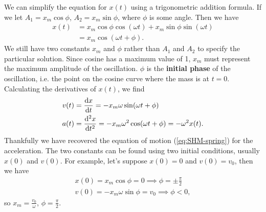 \documentclass[../classical_mechanics.tex]{subfiles}
\begin{document}
        We can simplify the equation for $x(t)$ using a trigonometric addition formula.
        If we let $A_1=x_m\cos\phi$, $A_2=x_m\sin\phi$, where $\phi$ is some angle.
        Then we have
        \begin{align}
            x(t)&=x_m\cos\phi\cos(\omega t)+x_m\sin\phi\sin(\omega t)\\
            &=x_m\cos(\omega t+\phi)\label{eq:SHM-displacement}.
        \end{align}
        We still have two constants $x_m$ and $\phi$ rather than $A_1$ and $A_2$ to specify the particular solution.
        Since cosine has a maximum value of 1, $x_m$ must represent the maximum amplitude of the oscillation.
        $\phi$ is the \textbf{initial phase} of the oscillation, i.e. the point on the cosine curve where the mass is at $t=0$.
        Calculating the derivatives of $x(t)$, we find
        \begin{align}
            v(t)&=\dv{x}{t}=-x_m\omega\sin(\omega t+\phi)\label{eq:SHM-velocity}\\
            a(t)&=\dv[2]{x}{t}=-x_m\omega^2\cos(\omega t+\phi)=-\omega^2x(t)\label{eq:SHM-acceleration}.
        \end{align}
        Thankfully we have recovered the equation of motion (\ref{eq:SHM-spring}) for the acceleration.
        The two constants can be found using two initial conditions, usually $x(0)$ and $v(0)$.
        For example, let's suppose $x(0)=0$ and $v(0)=v_0$, then we have
        \begin{align}
            x(0)=x_m\cos\phi=0\implies\phi=\pm\frac{\pi}{2}\\
            v(0)=-x_m\omega\sin\phi=v_0\implies\phi<0,
        \end{align}
        so $x_m=\frac{v_0}{\omega}$, $\phi=\frac{\pi}{2}$.
\end{document}

